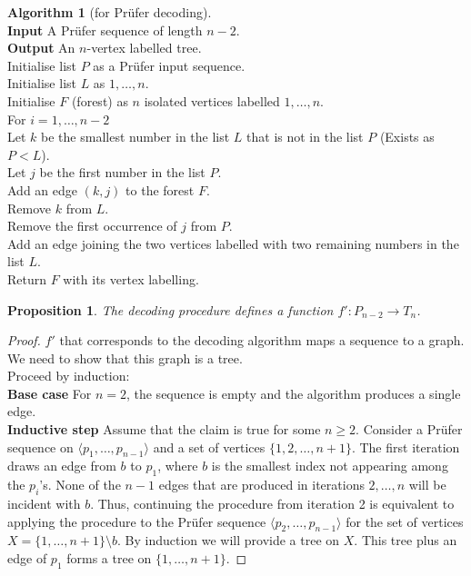 \documentclass{article}
\newtheorem*{prop}{Proposition}
\theoremstyle{definition}
\newtheorem*{alg}{Algorithm}
\begin{document}
\begin{alg}[for Pr\"ufer decoding]~\\
\textbf{Input} A Pr\"ufer sequence of length $n-2$.\\
\textbf{Output} An $n$-vertex labelled tree.\\
Initialise list $P$ as a Pr\"ufer input sequence. \\
Initialise list $L$ as $1,\ldots, n$. \\
Initialise $F$ (forest) as $n$ isolated vertices labelled $1,\ldots, n$. \\
For $i=1,\ldots, n-2$ \\
\indent Let $k$ be the smallest number in the list $L$ that is not in the list $P$ (Exists as $P<L$). \\
\indent Let $j$ be the first number in the list $P$. \\
\indent Add an edge $(k,j)$ to the forest $F$.\\
\indent Remove $k$ from $L$.\\
\indent Remove the first occurrence of $j$ from $P$.\\
Add an edge joining the two vertices labelled with two remaining numbers in the list $L$.\\
Return $F$ with its vertex labelling.
\end{alg}


\begin{prop}
The decoding procedure defines a function $f'\colon P_{n-2} \to T_n$.
\end{prop}

\begin{proof}
$f'$ that corresponds to the decoding algorithm maps a sequence to a graph.
We need to show that this graph is a tree. \\
Proceed by induction: \\
\textbf{Base case} For $n=2$, the sequence is empty and the algorithm produces a single edge. \\
\textbf{Inductive step} Assume that the claim is true for some $n\ge 2$.
Consider a Pr\"ufer sequence on $\langle p_1,\ldots,p_{n-1}\rangle$ and a set of vertices $\{1,2,\ldots,n+1\}$.
The first iteration draws an edge from $b$ to $p_1$, where $b$ is the smallest index not appearing among the $p_i$'s.
None of the $n-1$ edges that are produced in iterations $2,\ldots,n$ will be incident with $b$.
Thus, continuing the procedure from iteration 2 is equivalent to applying the procedure to the Pr\"ufer sequence $\langle p_2,\ldots,p_{n-1}\rangle$ for the set of vertices $X = \{1,\ldots,n+1\}\setminus b$.
By induction we will provide a tree on $X$.
This tree plus an edge of $p_1$ forms a tree on $\{1,\ldots,n+1\}$.
\end{proof}
\end{document}

